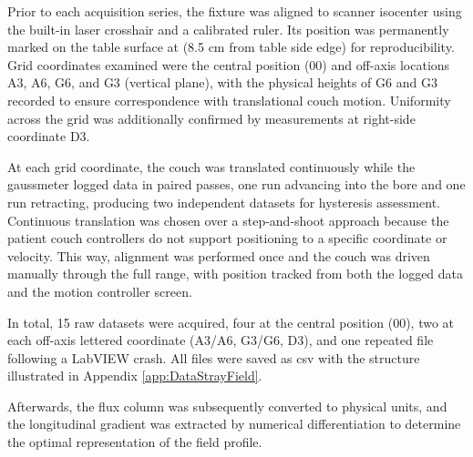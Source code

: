 Prior to each acquisition series, the fixture was aligned to scanner isocenter using the built-in laser crosshair and a calibrated ruler. Its position was permanently marked on the table surface at (8.5 cm from table side edge) for reproducibility. Grid coordinates examined were the central position (00) and off-axis locations A3, A6, G6, and G3 (vertical plane), with the physical heights of G6 and G3 recorded to ensure correspondence with translational couch motion. Uniformity across the grid was additionally confirmed by measurements at right-side coordinate D3.

At each grid coordinate, the couch was translated continuously while the gaussmeter logged data in paired passes, one run advancing into the bore and one run retracting, producing two independent datasets for hysteresis assessment. Continuous translation was chosen over a step-and-shoot approach because the patient couch controllers do not support positioning to a specific coordinate or velocity. This way, alignment was performed once and the couch was driven manually through the full range, with position tracked from both the logged data and the motion controller screen. 

In total, 15 raw datasets were acquired, four at the central position (00), two at each off-axis lettered coordinate (A3/A6, G3/G6, D3), and one repeated file following a LabVIEW crash. All files were saved as \gls{csv} with the structure illustrated in Appendix \ref{app:DataStrayField}.



Afterwards, the flux column was subsequently converted to physical units, and the longitudinal gradient was extracted by numerical differentiation to determine the optimal representation of the field profile.